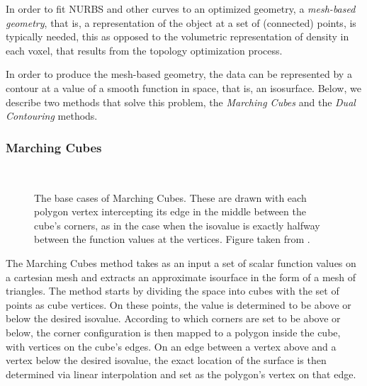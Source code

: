 
In order to fit NURBS and other curves to an optimized geometry, a \emph{mesh-based geometry}, that is, a representation of the object at a set of (connected) points, is typically needed, this as opposed to the volumetric representation of density in each voxel, that results from the topology optimization process. 

In order to produce the mesh-based geometry, the data can be represented by a contour at a value of a smooth function in space, that is, an isosurface. Below, we describe two methods that solve this problem, the \emph{Marching Cubes} and the \emph{Dual Contouring} methods.%

\subsubsection{Marching Cubes} 
\begin{figure}
\centering
   \\
   \caption{The base cases of Marching Cubes. These are drawn with each polygon vertex intercepting its edge in the middle between the cube's corners, as in the case when the isovalue is exactly halfway between the function values at the vertices. Figure taken from \cite{Marching2006}. }
   \label{fig:MC_basecase}
\end{figure}
The Marching Cubes method \cite{Marching2006} takes as an input a set of scalar function values on a cartesian mesh and extracts an approximate isourface in the form of a mesh of triangles. The method starts by
dividing the space into cubes with the set of points as cube vertices. On these points, the value is determined to be above or below the desired isovalue. According to which corners are set to be above or below, the corner configuration is then mapped to a polygon inside the cube, with vertices on the cube's edges. On an edge between a vertex above and a vertex below the desired isovalue, the exact location of the surface is then determined via linear interpolation and set as the polygon's vertex on that edge.

